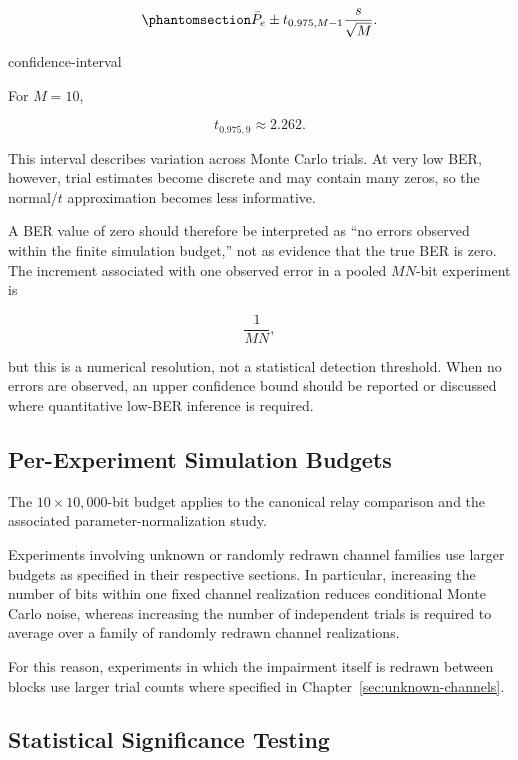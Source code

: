 \begin{equation}\protect\phantomsection\label{eq:confidence-interval}
\bar P_e
\pm
t_{0.975,M-1}
\frac{s}{\sqrt M}.
\end{equation}
{\protect\numberline{\theequation}\quad confidence-interval}

For $M=10$,

\[
t_{0.975,9}\approx2.262.
\]

This interval describes variation across Monte Carlo trials. At very
low BER, however, trial estimates become discrete and may contain many
zeros, so the normal/$t$ approximation becomes less informative.

A BER value of zero should therefore be interpreted as ``no errors
observed within the finite simulation budget,'' not as evidence that
the true BER is zero. The increment associated with one observed error
in a pooled $MN$-bit experiment is

\[
\frac{1}{MN},
\]

but this is a numerical resolution, not a statistical detection
threshold. When no errors are observed, an upper confidence bound
should be reported or discussed where quantitative low-BER inference
is required.


\subsection{Per-Experiment Simulation Budgets}

The $10\times10{,}000$-bit budget applies to the canonical relay
comparison and the associated parameter-normalization study.

Experiments involving unknown or randomly redrawn channel families use
larger budgets as specified in their respective sections. In
particular, increasing the number of bits within one fixed channel
realization reduces conditional Monte Carlo noise, whereas increasing
the number of independent trials is required to average over a family
of randomly redrawn channel realizations.

For this reason, experiments in which the impairment itself is redrawn
between blocks use larger trial counts where specified in
Chapter~\ref{sec:unknown-channels}.


\subsection{Statistical Significance Testing}
\label{sec:statistical-significance-testing}

